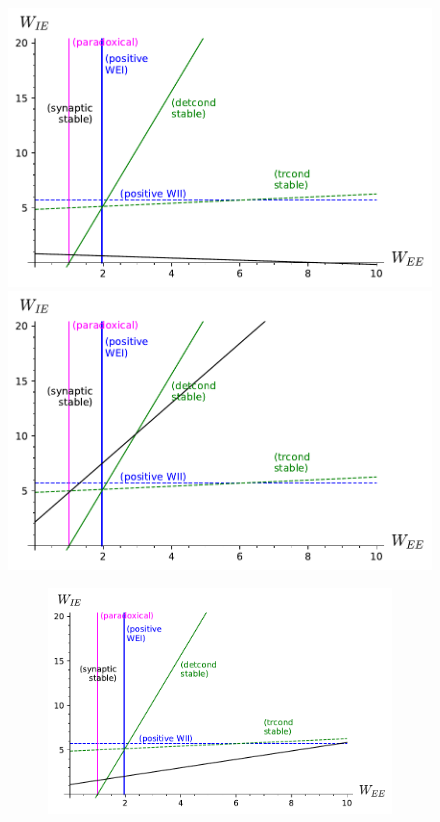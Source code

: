 \documentclass[twocolumn]{article}
\begin{document}
\begin{figure}[!ht]
\centering
\parbox[c]{\columnwidth}{
\includegraphics[width=\columnwidth]{TT_stability_slowHomeo.pdf}
\includegraphics[width=\columnwidth]{TT_stability_slowCross.pdf}}
\parbox[c]{\columnwidth}{
\begin{figure}[H]
\includegraphics[width=\columnwidth]{TT_stability_equal.pdf}

\end{figure}}
\end{figure}
\end{document}
